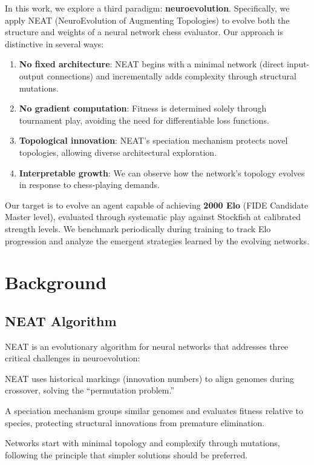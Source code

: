 \documentclass[11pt, twocolumn]{article}
\begin{document}
In this work, we explore a third paradigm: \textbf{neuroevolution}. Specifically, we apply NEAT (NeuroEvolution of Augmenting Topologies) \citep{stanley2002} to evolve both the structure and weights of a neural network chess evaluator. Our approach is distinctive in several ways:

\begin{enumerate}[leftmargin=*, itemsep=2pt]
    \item \textbf{No fixed architecture}: NEAT begins with a minimal network (direct input-output connections) and incrementally adds complexity through structural mutations.
    \item \textbf{No gradient computation}: Fitness is determined solely through tournament play, avoiding the need for differentiable loss functions.
    \item \textbf{Topological innovation}: NEAT's speciation mechanism protects novel topologies, allowing diverse architectural exploration.
    \item \textbf{Interpretable growth}: We can observe how the network's topology evolves in response to chess-playing demands.
\end{enumerate}

Our target is to evolve an agent capable of achieving \textbf{2000 Elo} (FIDE Candidate Master level), evaluated through systematic play against Stockfish at calibrated strength levels. We benchmark periodically during training to track Elo progression and analyze the emergent strategies learned by the evolving networks.

\section{Background}
\label{sec:background}

\subsection{NEAT Algorithm}
NEAT \citep{stanley2002} is an evolutionary algorithm for neural networks that addresses three critical challenges in neuroevolution:

\begin{description}[leftmargin=1em, itemsep=2pt]
    \item[Competing Conventions] NEAT uses historical markings (innovation numbers) to align genomes during crossover, solving the ``permutation problem.''
    \item[Topology Protection] A speciation mechanism groups similar genomes and evaluates fitness relative to species, protecting structural innovations from premature elimination.
    \item[Minimal Complexity] Networks start with minimal topology and complexify through mutations, following the principle that simpler solutions should be preferred.
\end{description}
\end{document}
